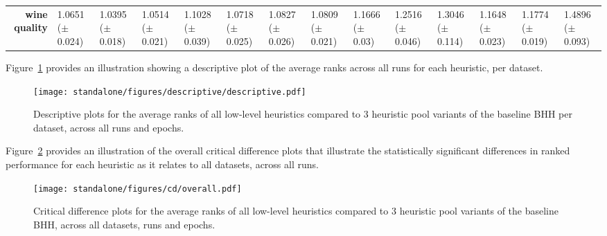 \begin{sidewaystable}[htbp]
{\begin{tabular}{r|lll|l|l|l|l|l|lllll}
			\textbf{wine quality}               & \cellcolor[rgb]{ .631,  .816,  .494}1.0651 ($\pm$0.024)                   & \cellcolor[rgb]{ .388,  .745,  .482}1.0395 ($\pm$0.018) & \cellcolor[rgb]{ .502,  .776,  .486}1.0514 ($\pm$0.021) & \cellcolor[rgb]{ 1,  .922,  .518}1.1028 ($\pm$0.039)    & \cellcolor[rgb]{ .698,  .831,  .498}1.0718 ($\pm$0.025) & \cellcolor[rgb]{ .804,  .863,  .506}1.0827 ($\pm$0.026) & \cellcolor[rgb]{ .788,  .859,  .502}1.0809 ($\pm$0.021) & \cellcolor[rgb]{ .996,  .839,  .502}1.1666 ($\pm$0.03)  & \cellcolor[rgb]{ .992,  .725,  .482}1.2516 ($\pm$0.046) & \cellcolor[rgb]{ .988,  .659,  .467}1.3046 ($\pm$0.114) & \cellcolor[rgb]{ .996,  .843,  .502}1.1648 ($\pm$0.023) & \cellcolor[rgb]{ .996,  .824,  .502}1.1774 ($\pm$0.019) & \cellcolor[rgb]{ .973,  .412,  .42}1.4896 ($\pm$0.093)  \\
			\cmidrule{5-5}\cmidrule{7-7}\cmidrule{9-9}\end{tabular}%

	}
\end{sidewaystable}%

Figure~\ref{fig:results:standalone:descriptive:descriptive} provides an illustration showing a descriptive plot of the average ranks across all runs for each heuristic, per dataset.

\begin{figure}[htbp]
	\centering
	\texttt{[image: standalone/figures/descriptive/descriptive.pdf]}
	\caption{Descriptive plots for the average ranks of all low-level heuristics compared to 3 heuristic pool variants of the baseline \Acs{BHH} per dataset, across all runs and epochs.}
	\label{fig:results:standalone:descriptive:descriptive}
\end{figure}

Figure~\ref{fig:results:standalone:descriptive:cd} provides an illustration of the overall critical difference plots that illustrate the statistically significant differences in ranked performance for each heuristic as it relates to all datasets, across all runs.

\begin{figure}[htbp]
	\centering
	\texttt{[image: standalone/figures/cd/overall.pdf]}
	\caption{Critical difference plots for the average ranks of all low-level heuristics compared to 3 heuristic pool variants of the baseline \acs{BHH}, across all datasets, runs and epochs.}
	\label{fig:results:standalone:descriptive:cd}
\end{figure}

